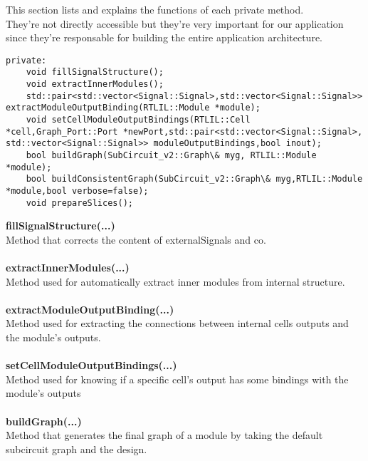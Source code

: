 \documentclass{article}
\begin{document}
This section lists and explains the functions of each private method.\\
They're not directly accessible but they're very important for our application since they're responsable for building the entire application architecture.\\

\begin{mdframed}[hidealllines=true, backgroundcolor=magenta!10]
	\begin{lstlisting}[basicstyle=\tiny]
private:
	void fillSignalStructure();
	void extractInnerModules();
	std::pair<std::vector<Signal::Signal>,std::vector<Signal::Signal>> extractModuleOutputBinding(RTLIL::Module *module);
	void setCellModuleOutputBindings(RTLIL::Cell *cell,Graph_Port::Port *newPort,std::pair<std::vector<Signal::Signal>, std::vector<Signal::Signal>> moduleOutputBindings,bool inout);
	bool buildGraph(SubCircuit_v2::Graph\& myg, RTLIL::Module *module);
	bool buildConsistentGraph(SubCircuit_v2::Graph\& myg,RTLIL::Module *module,bool verbose=false);
	void prepareSlices();
	\end{lstlisting}
\end{mdframed}

\textbf{fillSignalStructure(...)}\\
Method that corrects the content of externalSignals and co.\\\\

\textbf{extractInnerModules(...)}\\
Method used for automatically extract inner modules from internal structure.\\\\

\textbf{extractModuleOutputBinding(...)}\\
Method used for extracting the connections between internal cells outputs and the module's outputs.\\\\

\textbf{setCellModuleOutputBindings(...)}\\
Method used for knowing if a specific cell's output has some bindings with the module's outputs\\\\

\textbf{buildGraph(...)}\\
Method that generates the final graph of a module by taking the default subcircuit graph and the design.\\\\
\end{document}
